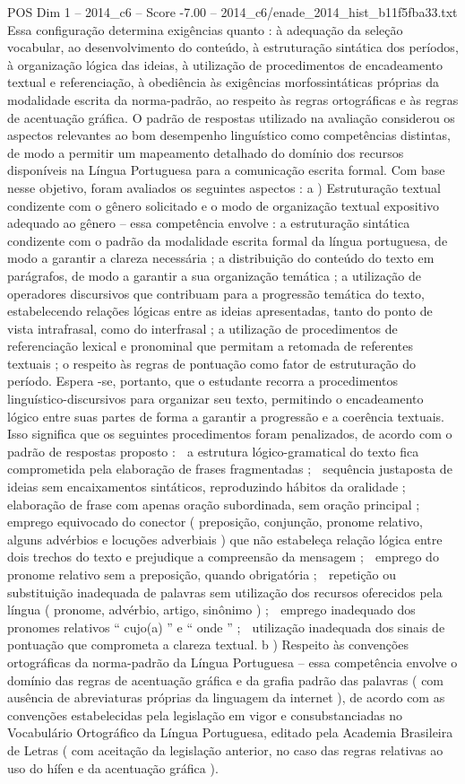 \begin{textsample}{POS Dim 1 – 2014\_c6 – Score -7.00 – 2014\_c6/enade\_2014\_hist\_b11f5fba33.txt}
Essa configuração determina exigências quanto : à adequação da seleção vocabular, ao desenvolvimento do conteúdo, à estruturação sintática dos períodos, à organização lógica das ideias, à utilização de procedimentos de encadeamento textual e referenciação, à obediência às exigências morfossintáticas próprias da modalidade escrita da norma-padrão, ao respeito às regras ortográficas e às regras de acentuação gráfica.
O padrão de respostas utilizado na avaliação considerou os aspectos relevantes ao bom desempenho linguístico como competências distintas, de modo a permitir um mapeamento detalhado do domínio dos recursos disponíveis na Língua Portuguesa para a comunicação escrita formal.
Com base nesse objetivo, foram avaliados os seguintes aspectos : a ) Estruturação textual condizente com o gênero solicitado e o modo de organização textual expositivo adequado ao gênero – essa competência envolve : a estruturação sintática condizente com o padrão da modalidade escrita formal da língua portuguesa, de modo a garantir a clareza necessária ; a distribuição do conteúdo do texto em parágrafos, de modo a garantir a sua organização temática ; a utilização de operadores discursivos que contribuam para a progressão temática do texto, estabelecendo relações lógicas entre as ideias apresentadas, tanto do ponto de vista intrafrasal, como do interfrasal ; a utilização de procedimentos de referenciação lexical e pronominal que permitam a retomada de referentes textuais ; o respeito às regras de pontuação como fator de estruturação do período.
Espera -se, portanto, que o estudante recorra a procedimentos linguístico-discursivos para organizar seu texto, permitindo o encadeamento lógico entre suas partes de forma a garantir a progressão e a coerência textuais.
Isso significa que os seguintes procedimentos foram penalizados, de acordo com o padrão de respostas proposto :  a estrutura lógico-gramatical do texto fica comprometida pela elaboração de frases fragmentadas ;  sequência justaposta de ideias sem encaixamentos sintáticos, reproduzindo hábitos da oralidade ;  elaboração de frase com apenas oração subordinada, sem oração principal ;  emprego equivocado do conector ( preposição, conjunção, pronome relativo, alguns advérbios e locuções adverbiais ) que não estabeleça relação lógica entre dois trechos do texto e prejudique a compreensão da mensagem ;  emprego do pronome relativo sem a preposição, quando obrigatória ;  repetição ou substituição inadequada de palavras sem utilização dos recursos oferecidos pela língua ( pronome, advérbio, artigo, sinônimo ) ;  emprego inadequado dos pronomes relativos “ cujo(a) ” e “ onde ” ;  utilização inadequada dos sinais de pontuação que comprometa a clareza textual. b ) Respeito às convenções ortográficas da norma-padrão da Língua Portuguesa – essa competência envolve o domínio das regras de acentuação gráfica e da grafia padrão das palavras ( com ausência de abreviaturas próprias da linguagem da internet ), de acordo com as convenções estabelecidas pela legislação em vigor e consubstanciadas no Vocabulário Ortográfico da Língua Portuguesa, editado pela Academia Brasileira de Letras ( com aceitação da legislação anterior, no caso das regras relativas ao uso do hífen e da acentuação gráfica ).

\end{textsample}
